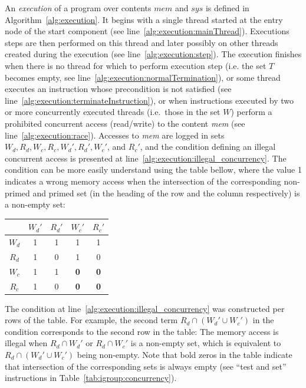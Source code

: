\documentclass[10pt,twocolumn]{article}
\begin{document}
An \emph{execution} of a program over contents $ \mathit{mem} $ and $
\mathit{sys} $ is defined in Algorithm~\ref{alg:execution}. It begins with a
single thread started at the entry node of the start component (see
line~\ref{alg:execution:mainThread}). Executions steps are then performed on
this thread and later possibly on other threads created during the execution
(see line~\ref{alg:execution:step}). The execution finishes when there is no
thread for which to perform execution step (i.e. the set $ T $ becomes empty,
see line~\ref{alg:execution:normalTermination}), or some thread executes an
instruction whose precondition is not satisfied (see
line~\ref{alg:execution:terminateInstruction}), or when instructions executed by
two or more concurrently executed threads (i.e.~those in the set $ W $) perform
a prohibited concurrent access (read/write) to the content \textit{mem} (see
line~\ref{alg:execution:race}). Accesses to \textit{mem} are logged in sets $
W_d, R_d, W_c, R_c, W_d', R_d', W_c' $, and $ R_c' $, and the condition defining
an illegal concurrent access is presented at
line~\ref{alg:execution:illegal_concurrency}. The condition can be more easily
understand using the table bellow, where the value 1 indicates a wrong memory
access when the intersection of the corresponding non-primed and primed set (in
the heading of the row and the column respectively) is a non-empty set:
\begin{center}
\begin{tabular}{c|cccc}
         & $ W_d' $ & $ R_d' $ & $ W_c' $ & $ R_c' $ \\\hline
$ W_d $  &    1     &    1     &    1     &    1     \\
$ R_d $  &    1     &    0     &    1     &    0     \\
$ W_c $  &    1     &    1     &\textbf{0}&\textbf{0}\\
$ R_c $  &    1     &    0     &\textbf{0}&\textbf{0}\\
\end{tabular}
\end{center}
The condition at line~\ref{alg:execution:illegal_concurrency} was constructed
per rows of the table. For example, the second term $ R_{d} \cap (W_{d}' \cup
W_{c}') $ in the condition corresponds to the second row in the table: The
memory access is illegal when $ R_{d} \cap W_{d}' $ or $ R_{d} \cap W_{c}' $ is
a non-empty set, which is equivalent to $ R_{d} \cap (W_{d}' \cup W_{c}') $
being non-empty. Note that bold zeros in the table indicate that intersection of
the corresponding sets is always empty (see ``test and set'' instructions in
Table~\ref{tab:igroup:concurrency}).
\end{document}
